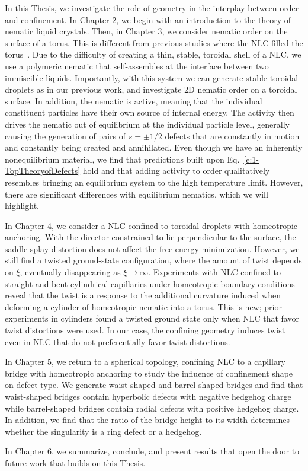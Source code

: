 In this Thesis, we investigate the role of geometry in the interplay between order and confinement.
In Chapter 2, we begin with an introduction to the theory of nematic liquid crystals.
Then, in Chapter 3, we consider nematic order on the surface of a torus.
This is different from previous studies where the NLC filled the torus~\cite{RN24,RN274,RN44}.
Due to the difficulty of creating a thin, stable, toroidal shell of a NLC, we use a polymeric nematic that self-assembles at the interface between two immiscible liquids.
Importantly, with this system we can generate stable toroidal droplets as in our previous work, and investigate 2D nematic order on a toroidal surface.
In addition, the nematic is active, meaning that the individual constituent particles have their own source of internal energy.
The activity then drives the nematic out of equilibrium at the individual particle level, generally causing the generation of pairs of $s = \pm 1/2$ defects that are constantly in motion and constantly being created and annihilated.
Even though we have an inherently nonequilibrium material, we find that predictions built upon Eq.~\ref{e:1-TopTheoryofDefects} hold and that adding activity to order qualitatively resembles bringing an equilibrium system to the high temperature limit.
However, there are significant differences with equilibrium nematics, which we will highlight.

In Chapter 4, we consider a NLC confined to toroidal droplets with homeotropic anchoring.
With the director constrained to lie perpendicular to the surface, the saddle-splay distortion does not affect the free energy minimization.
However, we still find a twisted ground-state configuration, where the amount of twist depends on $\xi$, eventually disappearing as $\xi \rightarrow \infty$.
Experiments with NLC confined to straight and bent cylindrical capillaries under homeotropic boundary conditions reveal that the twist is a response to the additional curvature induced when deforming a cylinder of homeotropic nematic into a torus.
This is new; prior experiments in cylinders found a twisted ground state only when NLC that favor twist distortions were used.
In our case, the confining geometry induces twist even in NLC that do not preferentially favor twist distortions.

In Chapter 5, we return to a spherical topology, confining NLC to a capillary bridge with homeotropic anchoring to study the influence of confinement shape on defect type.
We generate waist-shaped and barrel-shaped bridges and find that waist-shaped bridges contain hyperbolic defects with negative hedgehog charge while barrel-shaped bridges contain radial defects with positive hedgehog charge.
In addition, we find that the ratio of the bridge height to its width determines whether the singularity is a ring defect or a hedgehog.

In Chapter 6, we summarize, conclude, and present results that open the door to future work that builds on this Thesis.
